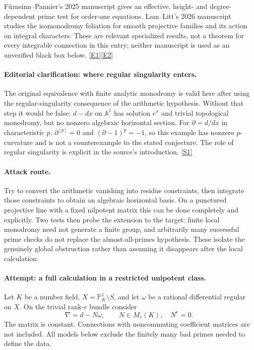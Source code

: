 \documentclass[11pt,a4paper]{article}
\newcommand{\A}{\mathbb{A}}
\newcommand{\PP}{\mathbb P}
\newcommand{\sref}[2]{\hyperlink{source:#1:#2}{[S#2]}}
\newcommand{\eref}[2]{\hyperlink{extra:#1:#2}{[E#2]}}
\numberwithin{equation}{section}
\begin{document}
F\"urnsinn--Pannier's 2025 manuscript gives an effective, height- and
degree-dependent prime test for order-one equations. Lam--Litt's 2026
manuscript studies the isomonodromy foliation for smooth projective families
and its action on integral characters. These are relevant specialized
results, not a theorem for every integrable connection in this entry;
neither manuscript is used as an unverified black box below.
\eref{statement}{1}\eref{statement}{2}

\paragraph{Editorial clarification: where regular singularity enters.}
The original equivalence with finite analytic monodromy is valid here after
using the regular-singularity consequence of the arithmetic hypothesis.
Without that step it would be false: $d-dx$ on $\A^1$ has solution $e^x$ and
trivial topological monodromy, but no nonzero algebraic horizontal section.
For $\partial=d/dx$ in characteristic $p$, $\partial^{[p]}=0$ and
$(\partial-1)^p=-1$, so this example has nonzero $p$-curvature and is not a
counterexample to the stated conjecture. The role of regular singularity is
explicit in the source's introduction. \sref{statement}{1}

\paragraph{Attack route.}
Try to convert the arithmetic vanishing into residue constraints, then
integrate those constraints to obtain an algebraic horizontal basis. On a
punctured projective line with a fixed nilpotent matrix this can be done
completely and explicitly. Two tests then probe the extension to the target:
finite local monodromy need not generate a finite group, and arbitrarily
many successful prime checks do not replace the almost-all-primes
hypothesis. These isolate the genuinely global obstruction rather than
assuming it disappears after the local calculation.

\paragraph{Attempt: a full calculation in a restricted unipotent class.}
Let $K$ be a number field,
$X=\PP^1_K\setminus S$, and let $\omega$ be a rational differential regular
on $X$. On the trivial rank-$r$ bundle consider
\begin{equation}\label{statement:unipotent}
 \nabla=d-N\omega,\qquad
 N\in M_r(K),\quad N^r=0.
\end{equation}
The matrix is constant. Connections with noncommuting coefficient matrices
are not included. All models below exclude the finitely many bad primes
needed to define the data.
\end{document}
